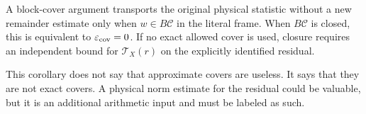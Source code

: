 \begin{corollary}
\label{cor:exactness-threshold}
A block-cover argument transports the original physical statistic
without a new remainder estimate only when
\(w\in B\mathscr C\) in the literal frame.  When
\(B\mathscr C\) is closed, this is equivalent to
\(\varepsilon_{\mathrm{cov}}=0\).  If no exact allowed cover is used, closure
requires an independent bound for \(\mathcal T_X(r)\) on the
explicitly identified residual.
\end{corollary}

\begin{remark}
This corollary does not say that approximate covers are useless.  It
says that they are not exact covers.  A physical norm estimate for
the residual could be valuable, but it is an additional arithmetic
input and must be labeled as such.
\end{remark}
